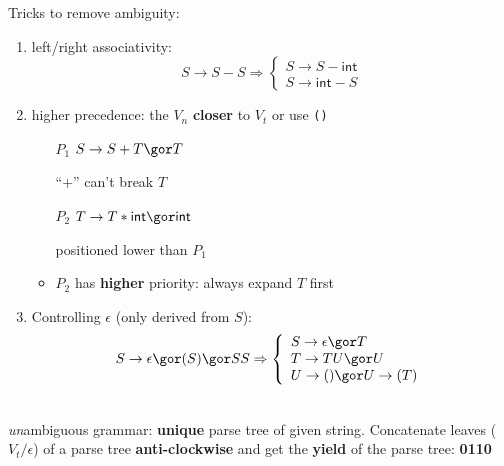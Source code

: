 {\footnotesize
\begin{minipage}{0.45\linewidth}
Tricks to remove ambiguity:
\begin{enumerate}
\item left/right associativity:
  \[
    S \rightarrow S - S \Rightarrow\left\{
      \begin{array}{l}
        S \rightarrow S - \mathsf{int} \\
        S \rightarrow \mathsf{int} - S
      \end{array}
       \right.
  \]
\item higher precedence: the \(V_{n}\) \textbf{closer} to \(V_{t}\) or use \verb|()|
  \begin{itemize}[leftmargin=1.5em]
    \item[$P_{1}$] \(S \rightarrow S + T \gor T\)
    \item[] ``+'' can't break \(T\)
    \item[$P_{2}$] \(T \rightarrow T * \mathsf{int} \gor \mathsf{int}\)
    \item[] positioned lower than \(P_{1}\)
    \item \(P_{2}\) has \textbf{higher} priority: always expand \(T\) first
    \end{itemize}
\item Controlling \(\epsilon\) (only derived from \(S\)):
  \[
    S \rightarrow \epsilon \gor (S) \gor SS \Rightarrow\left\{
        \begin{array}{l}
          S \rightarrow \epsilon \gor T\\
          T \rightarrow TU \gor U\\
          U \rightarrow () \gor U \rightarrow (T)
        \end{array}
      \right.
  \]
\end{enumerate}
\end{minipage}
\begin{minipage}{0.45\linewidth}
  \centering
{}\\
\emph{un}ambiguous grammar: \textbf{unique} parse tree of given string.  Concatenate leaves (\(V_{t}/\epsilon\)) of a parse tree \textbf{anti-clockwise} and get the \textbf{yield} of the parse tree: \textbf{0110}
\end{minipage}
}
